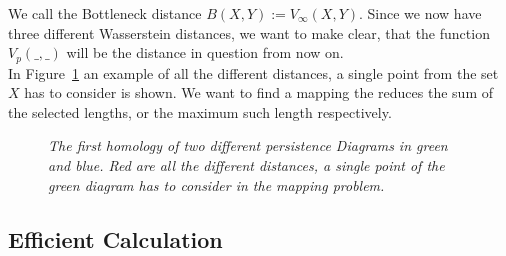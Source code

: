 \documentclass[11pt, a4paper, UKenglish]{article}
\begin{document}
    We call the Bottleneck distance $B(X,Y) := V_\infty(X,Y)$.
    Since we now have three different Wasserstein distances, we want to make clear, that the function $V_p(\_,\_)$ will be the distance in question from now on.\\
    In Figure\ \ref{distances} an example of all the different distances, a single point from the set $X$ has to consider is shown.
    We want to find a mapping the reduces the sum of the selected lengths, or the maximum such length respectively.
    \begin{figure}
        \centering
        \caption{\textit{The first homology of two different persistence Diagrams in green and blue.
        Red are all the different distances, a single point of the green diagram has to consider in the mapping problem.}}
        \label{distances}
    \end{figure}

    \subsection{Efficient Calculation}\label{subsec:efficient-calculation}
\end{document}
